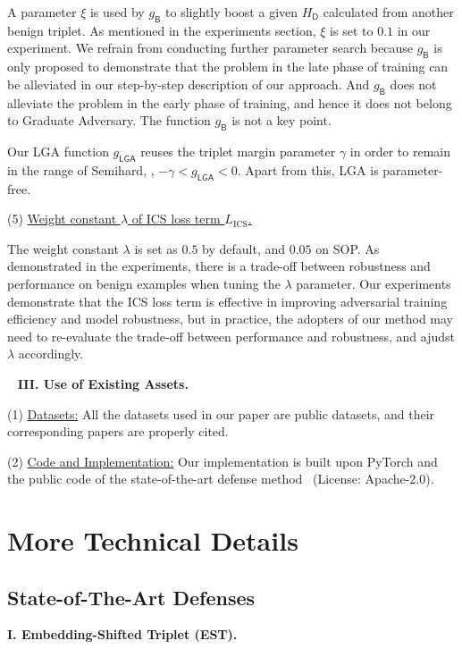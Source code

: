 A parameter $\xi$ is used by $g_\mathsf{B}$ to slightly boost a given
$H_\mathsf{D}$ calculated from another benign triplet.
%
As mentioned in the experiments section, $\xi$ is set to $0.1$ in our
experiment.
%
We refrain from conducting further parameter search because $g_\mathsf{B}$
is only proposed to demonstrate that the problem in the late phase of
training can be alleviated in our step-by-step description of our approach.
%
And $g_\mathsf{B}$ does not alleviate the problem in the early phase of
training, and hence it does not belong to Graduate Adversary.
%
The function $g_\mathsf{B}$ is not a key point.

Our LGA function $g_\mathsf{LGA}$ reuses the triplet margin parameter $\gamma$
in order to remain in the range of Semihard, \ie, $-\gamma<g_\mathsf{LGA}<0$.
%
Apart from this, LGA is parameter-free.

(5) \ul{Weight constant $\lambda$ of ICS loss term $L_\text{ICS}$.}

The weight constant $\lambda$ is set as $0.5$ by default, and $0.05$ on SOP.
%
As demonstrated in the experiments, there is a trade-off between robustness and
performance on benign examples when tuning the $\lambda$ parameter.
%
Our experiments demonstrate that the ICS loss term is effective in improving
adversarial training efficiency and model robustness, but in practice, the
adopters of our method may need to re-evaluate the trade-off between
performance and robustness, and ajudst $\lambda$ accordingly.

~\newline
\noindent\textbf{III. Use of Existing Assets.}

(1) \ul{Datasets:} All the datasets used in our paper are public datasets,
and their corresponding papers are properly cited.

(2) \ul{Code and Implementation:} Our implementation is built upon PyTorch
and the public code of the state-of-the-art defense method~\cite{robrank}
(License: Apache-2.0).

\section{More Technical Details}
\label{sec:b}

\subsection{State-of-The-Art Defenses}
\label{sec:b1}

\noindent\textbf{I. Embedding-Shifted Triplet (EST).}~\cite{advrank}

